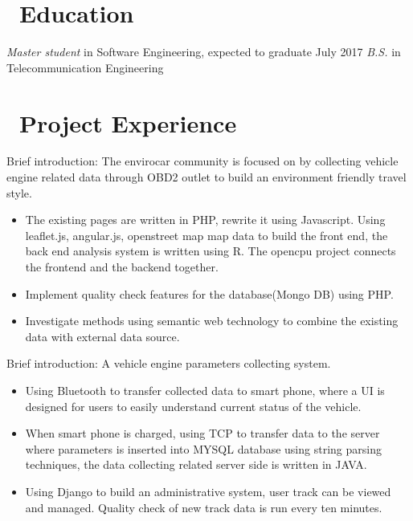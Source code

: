 \documentclass{resume}
\begin{document}


 
\section{\faGraduationCap\ Education}
\textit{Master student} in Software Engineering, expected to graduate July 2017
\textit{B.S.} in Telecommunication Engineering

\section{\faUsers\ Project Experience}
Brief introduction: The envirocar community is focused on by collecting vehicle engine related data through OBD2 outlet to build an environment friendly travel style.
\begin{itemize}
  \item The existing pages are written in PHP, rewrite it using Javascript. Using leaflet.js, angular.js, openstreet map map data to build the front end, the back end analysis system is written using R. The opencpu project connects the frontend and the backend together.
  \item Implement quality check features for the database(Mongo DB) using PHP.
  \item Investigate methods using semantic web technology to combine the existing data with external data source. 
\end{itemize}

Brief introduction: A vehicle engine parameters collecting system.
\begin{itemize}
  \item Using Bluetooth to transfer collected data to smart phone, where a UI is designed for users to easily understand current status of the vehicle.
  \item When smart phone is charged, using TCP to transfer data to the server where parameters is inserted into MYSQL database using string parsing techniques, the data collecting related server side is written in JAVA. 
  \item Using Django to build an administrative system, user track can be viewed and managed. Quality check of new track data is run every ten minutes.
\end{itemize}
\end{document}
